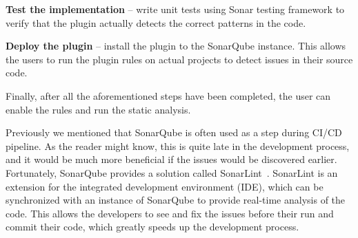 \begin{flushleft}
    \textbf{Test the implementation} -- write unit tests using Sonar testing framework to verify that the
    plugin actually detects the correct patterns in the code.
\end{flushleft}

\begin{flushleft}
    \textbf{Deploy the plugin} -- install the plugin to the SonarQube instance.
    This allows the users to run the plugin rules on actual projects to detect issues in their source code.
\end{flushleft}

Finally, after all the aforementioned steps have been completed, the user can enable the rules and run the static analysis.

Previously we mentioned that SonarQube is often used as a step during CI/CD pipeline.
As the reader might know, this is quite late in the development process, and it would be much more beneficial if the issues
would be discovered earlier.
Fortunately, SonarQube provides a solution called SonarLint~\cite{sonarlint}.
SonarLint is an extension for the integrated development environment (IDE), which can be synchronized with an instance of SonarQube to provide
real-time analysis of the code.
This allows the developers to see and fix the issues before their run and commit their code, which greatly
speeds up the development process.

